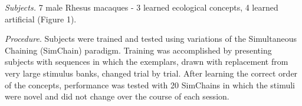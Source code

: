 \documentclass[a0,portrait]{a0poster}
\begin{document}
\begin{multicols}{2}
%
%
%
%
%
%
%
\textit{Subjects.} 7 male Rhesus macaques - 3 learned ecological concepts, 4 learned artificial (Figure 1).

\textit{Procedure}. Subjects were trained and tested using variations of the Simultaneous Chaining (SimChain) paradigm. Training was accomplished by presenting subjects with sequences in which the exemplars, drawn with replacement from very large stimulus banks, changed trial by trial. After learning the correct order of the concepts, performance was tested with 20 SimChains in which the stimuli were novel and did not change over the course of each session.








\end{multicols}
\end{document}
